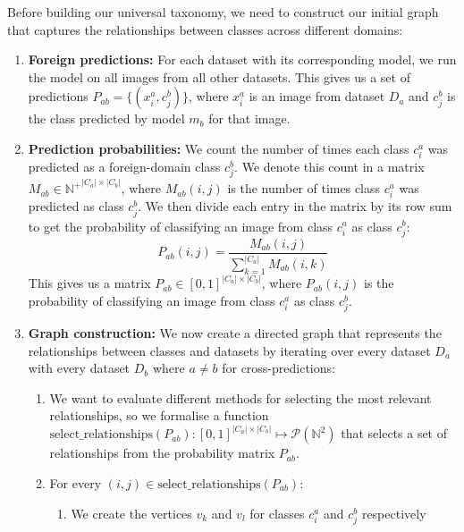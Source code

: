 Before building our universal taxonomy,
we need to construct our initial graph that captures the relationships between classes across different domains:

\begin{enumerate}
    \item \textbf{Foreign predictions:} For each dataset with its corresponding model,
          we run the model on all images from all other datasets.
          This gives us a set of predictions $P_{ab} = \{(x_i^a, c_j^b)\}$,
          where $x_i^a$ is an image from dataset $D_a$ and $c_j^b$ is the class
          predicted by model $m_b$ for that image.
    \item \textbf{Prediction probabilities:} We count the number of times each class $c_i^a$ was predicted
          as a foreign-domain class $c_j^b$.
          We denote this count in a matrix $M_{ab}\in {\mathbb{N}^+}^{|C_a| \times |C_b|}$,
          where $M_{ab}(i, j)$ is the number of times class $c_i^a$ was predicted
          as class $c_j^b$.
          We then divide each entry in the matrix by its row sum to get the
          probability of classifying an image from class $c_i^a$ as class $c_j^b$:
          \begin{equation*}
              P_{ab}(i, j) = \frac{M_{ab}(i, j)}{\sum_{k=1}^{|C_a|} M_{ab}(i, k)}
          \end{equation*}
          This gives us a matrix $P_{ab}\in [0, 1]^{|C_a| \times |C_b|}$,
          where $P_{ab}(i, j)$ is the probability of classifying an image from class $c_i^a$
          as class $c_j^b$.
    \item \textbf{Graph construction:} We now create a directed graph that represents the relationships between classes and datasets
          by iterating over every dataset $D_a$ with every dataset $D_b$ where $a \neq b$ for cross-predictions:
          \begin{enumerate}
              \item We want to evaluate different methods for selecting the most relevant relationships,
                    so we formalise a function $\text{select\_relationships}(P_{ab}): [0, 1]^{|C_a| \times |C_b|} \mapsto \mathcal{P}(\mathbb{N}^2)$
                    that selects a set of relationships from the probability matrix $P_{ab}$.
              \item For every $(i, j) \in \text{select\_relationships}(P_{ab})$:
                    \begin{enumerate}
                        \item We create the vertices $v_k$ and $v_l$ for classes $c_i^a$ and $c_j^b$ respectively

\end{enumerate}
\end{enumerate}
\end{enumerate}
